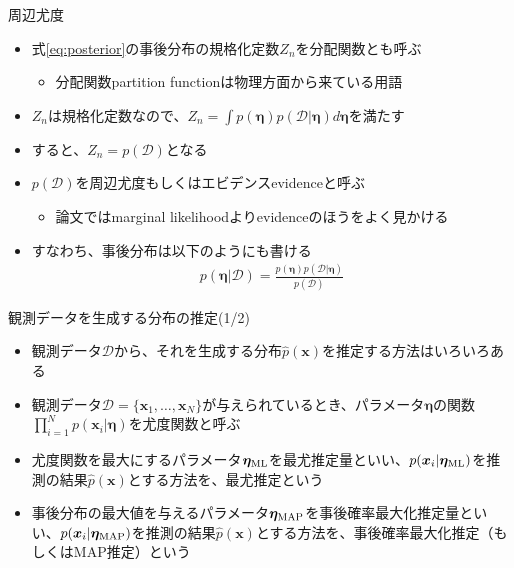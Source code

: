 \documentclass[aspectratio=169,unicode,dvipdfmx,14pt]{beamer}
\begin{document}
\begin{frame}{周辺尤度}
\begin{itemize}
\item 式\eqref{eq:posterior}の事後分布の規格化定数$Z_n$を分配関数とも呼ぶ
\begin{itemize}
\item 分配関数partition functionは物理方面から来ている用語
\end{itemize}
\item $Z_n$は規格化定数なので、$Z_n = \int p(\bm{\eta}) p(\mathcal{D}|\bm{\eta}) d\bm{\eta}$を満たす
\item すると、$Z_n = p(\mathcal{D})$となる
\item $p(\mathcal{D})$を周辺尤度もしくはエビデンスevidenceと呼ぶ
\begin{itemize}
\item 論文ではmarginal likelihoodよりevidenceのほうをよく見かける
\end{itemize}
\item すなわち、事後分布は以下のようにも書ける
\begin{align}
p(\bm{\eta} | \mathcal{D}) = \frac{ p(\bm{\eta}) p(\mathcal{D}|\bm{\eta}) }{ p(\mathcal{D}) }
\end{align}
\end{itemize}
\end{frame}

\begin{frame}{観測データを生成する分布の推定(1/2)}
\begin{itemize}
\item 観測データ$\mathcal{D}$から、それを生成する分布$\hat{p}(\bm{x})$を推定する方法はいろいろある
\item 観測データ$\mathcal{D}=\{\bm{x}_1,\ldots,\bm{x}_N\}$が与えられているとき、パラメータ$\bm{\eta}$の関数$\prod_{i=1}^N p(\bm{x}_i|\bm{\eta})$を尤度関数と呼ぶ
\item[1.] 尤度関数を最大にするパラメータ$\bm{\eta}_{\mbox{\scriptsize ML}}$を最尤推定量といい、$p(\bm{x}_i | \bm{\eta}_{\mbox{\scriptsize ML}})$を推測の結果$\hat{p}(\bm{x})$とする方法を、最尤推定という
\item[2.] 事後分布の最大値を与えるパラメータ$\bm{\eta}_{\mbox{\scriptsize MAP}}$を事後確率最大化推定量といい、$p(\bm{x}_i | \bm{\eta}_{\mbox{\scriptsize MAP}})$を推測の結果$\hat{p}(\bm{x})$とする方法を、事後確率最大化推定（もしくはMAP推定）という
\end{itemize}
\end{frame}
\end{document}
